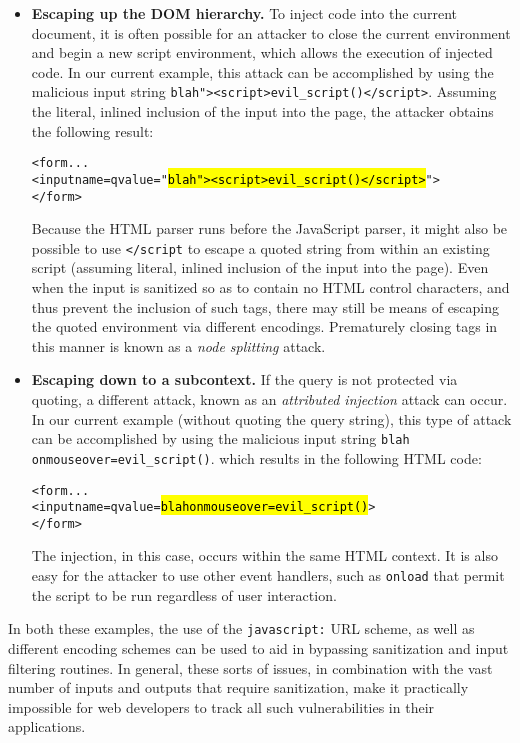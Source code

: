 \documentclass{acmtrans2m}
\begin{document}
\begin{itemize}
 \item \textbf{Escaping up the DOM hierarchy.}
 To inject code into the current document, it is often possible for an attacker to close the current environment and begin a new script environment, which allows the execution of injected code.
In our current example, this attack can be accomplished by using the malicious input string \texttt{blah"><script>evil\_script()</script>}.
Assuming the literal, inlined inclusion of the input into the page, the attacker obtains the following result:
 \begin{alltt}
   <form ...
     <input name=q value="\hl{blah"><script>evil_script()</script>}">
   </form>
 \end{alltt}
 Because the HTML parser runs before the JavaScript parser, it might also be possible to use \texttt{</script} to escape a quoted string from within an existing script (assuming literal, inlined inclusion of the input into the page).
Even when the input is sanitized so as to contain no HTML control characters, and thus prevent the inclusion of such tags, there may still be means of escaping the quoted environment via different encodings.
Prematurely closing tags in this manner is known as a \emph{node splitting} attack.

 \item \textbf{Escaping down to a subcontext.}
 If the query is not protected via quoting, a different attack, known as an \emph{attributed injection} attack can occur.
In our current example (without quoting the query string), this type of attack can be accomplished by using the malicious input string \texttt{blah onmouseover=evil\_script()}.
which results in the following HTML code:
 \begin{alltt}
   <form ...
     <input name=q value=\hl{blah onmouseover=evil_script()}>
   </form>
 \end{alltt}
 The injection, in this case, occurs within the same HTML context.
It is also easy for the attacker to use other event handlers, such as \texttt{onload} that permit the script to be run regardless of user interaction.

\end{itemize}

In both these examples, the use of the \texttt{javascript:} URL scheme, as well as different encoding schemes can be used to aid in bypassing sanitization and input filtering routines.
In general, these sorts of issues, in combination with the vast number of inputs and outputs that require sanitization, make it practically impossible for web developers to track all such vulnerabilities in their applications.
\end{document}
